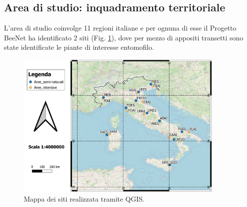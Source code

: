 \documentclass[main.tex]{subfiles}
\begin{document}
\subsection{Area di studio: inquadramento territoriale}

L’area di studio coinvolge 11 regioni italiane e per ognuna di esse il Progetto BeeNet ha identificato 2 siti (Fig. \ref{fig:Area}), dove per mezzo di appositi transetti sono state identificate le piante di interesse entomofilo.

\begin{figure}[H]
\centering
\includegraphics[width=0.9\textwidth]{./Immagini/Area_di_studio}
\caption{Mappa dei siti realizzata tramite QGIS.}
\label{fig:Area}
\end{figure}
\end{document}
